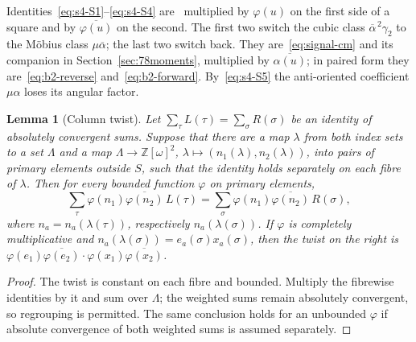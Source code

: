 \documentclass[11pt]{article}
\numberwithin{equation}{section}
\newcommand{\OO}{\mathbb Z[\omega]}
\newtheorem{lemma}{Lemma}
\begin{document}
Identities~\eqref{eq:s4-S1}--\eqref{eq:s4-S4} are~\cite[proof of Lemma~17.2, \emph{The first Poisson transformation}, \emph{The second Poisson transformation}]{OAI78} multiplied by
$\varphi(u)$ on the first side of a square and by $\overline{\varphi(u)}$ on the second. The first two switch the
cubic class $\overline\alpha^{\,2}\gamma_2$ to the M\"obius class $\mu\overline\alpha$; the last two switch back.
They are~\eqref{eq:signal-cm} and its companion in Section~\ref{sec:78moments}, multiplied by $\overline{\alpha(u)}$;
in paired form they are~\eqref{eq:b2-reverse} and~\eqref{eq:b2-forward}. By~\eqref{eq:s4-S5} the
anti-oriented coefficient $\mu\alpha$ loses its angular factor.

\begin{lemma}[Column twist]\label{lem:s4-transfer}
Let $\sum_{\tau}L(\tau)=\sum_{\sigma}R(\sigma)$ be an identity of absolutely convergent sums. Suppose that
there are a map $\lambda$ from both index sets to a set $\Lambda$ and a map $\Lambda\to\OO^2$,
$\lambda\mapsto(n_1(\lambda),n_2(\lambda))$, into pairs of primary elements outside $S$, such that the
identity holds separately on each fibre of $\lambda$. Then for every bounded function $\varphi$ on primary elements,
\begin{equation}\label{eq:d173}
 \sum_\tau\varphi(n_1)\overline{\varphi(n_2)}\,L(\tau)=\sum_\sigma\varphi(n_1)\overline{\varphi(n_2)}\,R(\sigma),
\end{equation}
where $n_a=n_a(\lambda(\tau))$, respectively $n_a(\lambda(\sigma))$. If $\varphi$ is completely multiplicative
and $n_a(\lambda(\sigma))=e_a(\sigma)x_a(\sigma)$, then the twist on the right is
$\varphi(e_1)\overline{\varphi(e_2)}\cdot\varphi(x_1)\overline{\varphi(x_2)}$.
\end{lemma}

\begin{proof}
The twist is constant on each fibre and bounded. Multiply the fibrewise identities
by it and sum over $\Lambda$; the weighted sums remain absolutely convergent, so
regrouping is permitted. The same conclusion holds for an unbounded $\varphi$ if
absolute convergence of both weighted sums is assumed separately.
\end{proof}
\end{document}
